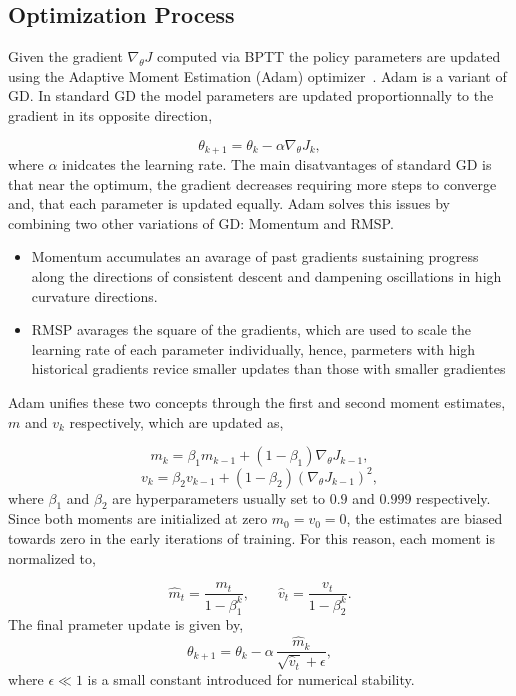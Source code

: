 \subsection{Optimization Process}
Given the gradient $\nabla_\theta J$ computed via \ac{BPTT} the policy parameters are updated using the Adaptive Moment Estimation (Adam) optimizer~\cite{kingma_adam_2017}.
Adam is a variant of \ac{GD}.
In standard \ac{GD} the model parameters are updated proportionnally to the gradient in its opposite direction,

\begin{equation}
    \theta_{k+1} = \theta_k - \alpha\nabla_\theta J_k,
\end{equation}
where $\alpha$ inidcates the learning rate. 
The main disatvantages of standard \ac{GD} is that near the optimum, the gradient decreases requiring more steps to converge and, that each parameter is updated equally.
Adam solves this issues by combining two other variations of \ac{GD}: Momentum and \ac{RMSP}.

\begin{itemize}
    \item Momentum accumulates an avarage of past gradients sustaining progress along the directions of consistent descent and dampening oscillations in high curvature directions.
    \item \ac{RMSP} avarages the square of the gradients, which are used to scale the learning rate of each parameter individually, hence, parmeters with high historical gradients revice smaller updates than those with smaller gradientes 
\end{itemize}
Adam unifies these two concepts through the first and second moment estimates, $m$ and $v_k$ respectively, which are updated as,

\begin{equation}
    m_k = \beta_1 m_{k-1} + (1-\beta_1)\nabla_\theta J_{k-1},
\end{equation}
\begin{equation}
    v_k = \beta_2 v_{k-1} + (1-\beta_2)(\nabla_\theta J_{k-1})^2,
\end{equation}
where $\beta_1$ and $\beta_2$ are hyperparameters usually set to $0.9$ and $0.999$ respectively. Since both moments are initialized at zero $m_0 = v_0 = 0$, the estimates are biased towards zero in the early iterations of training.
For this reason, each moment is normalized to,

\begin{equation}
    \hat{m}_t = \frac{m_t}{1 - \beta_1^k}, \qquad \hat{v}_t = \frac{v_t}{1 - \beta_2^k}.
\end{equation}
The final prameter update is given by,
\begin{equation}
    \theta_{k+1} = \theta_k - \alpha\, \frac{\hat{m}_k}{\sqrt{\hat{v}_t} + \epsilon},
    \label{eq:adam}
\end{equation}
where $\epsilon \ll 1$ is a small constant introduced for numerical stability.
